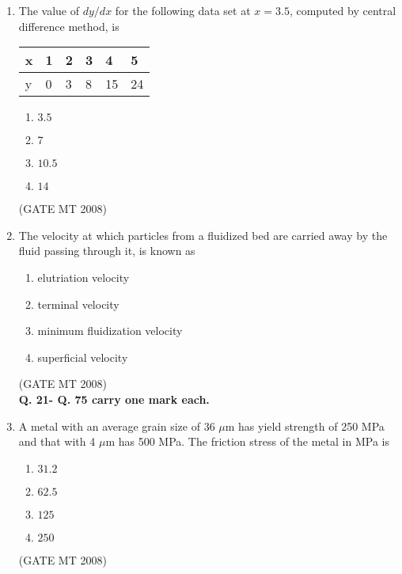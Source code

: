 \documentclass[11pt, letterpaper]{article}
\theoremstyle{remark}
\begin{document}
\begin{enumerate}[label=Q.\arabic*]
\item The value of $dy/dx$ for the following data set at $x = 3.5$, computed by central difference method, is\\
\begin{center}
\begin{tabular}{ | m{1cm} | m{1cm}| m{1cm} | m{1cm} | m{1cm} | m{1cm} | } 
  \hline
  x & 1 & 2 & 3 & 4 & 5 \\ 
  \hline
  y & 0 & 3 & 8 & 15 & 24 \\ 
  \hline 
\end{tabular}
\end{center}

\begin{multicols}{4}
 \begin{enumerate}[label=(\MakeUppercase{\alph*})]
  \item $3.5$
  \item $7$
  \item $10.5$
  \item $14$
 \end{enumerate}
\end{multicols}
\vspace{-5mm}
\hfill(GATE MT 2008)


\item The velocity at which particles from a fluidized bed are carried away by the fluid passing through it, is known as
\vspace{-0.9em}
\begin{multicols}{2}
      \begin{enumerate}
        \item elutriation velocity
        \item terminal velocity
        \item minimum fluidization velocity
        \item superficial velocity
      \end{enumerate}
    \end{multicols}
\vspace{4mm}
\hfill(GATE MT 2008)\\
{\large \textbf{Q. 21- Q. 75 carry one mark each.}}\\

\item A metal with an average grain size of 36 $\mu$m has yield strength of 250 MPa and that with 4 $\mu$m has 500 MPa. The friction stress of the metal in MPa is
\vspace{-0.9em}
\begin{multicols}{4}
 \begin{enumerate}[label=(\MakeUppercase{\alph*})]
  \item $31.2$
  \item $62.5$
  \item $125$
  \item $250$
 \end{enumerate}
\end{multicols}
\vspace{-5mm}
\hfill(GATE MT 2008)


\end{enumerate}
\end{document}
